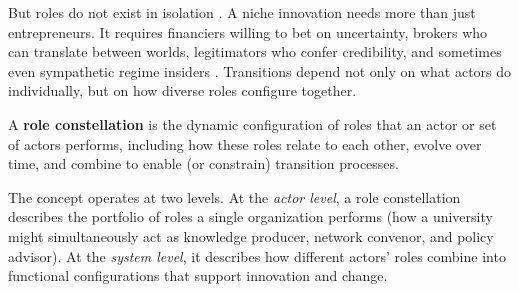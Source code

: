 \documentclass[../main.tex]{subfiles}
\begin{document}
But roles do not exist in isolation \cite{padgett2012emergence}. A niche innovation needs more than just entrepreneurs. It requires financiers willing to bet on uncertainty, brokers who can translate between worlds, legitimators who confer credibility, and sometimes even sympathetic regime insiders \cite{schot2018three,suchman1995managing}. Transitions depend not only on what actors do individually, but on how diverse roles configure together.

\begin{roledef}
A \textbf{role constellation} is the dynamic configuration of roles that an actor or set of actors performs, including how these roles relate to each other, evolve over time, and combine to enable (or constrain) transition processes.
\end{roledef}

The concept operates at two levels. At the \emph{actor level}, a role constellation describes the portfolio of roles a single organization performs (how a university might simultaneously act as knowledge producer, network convenor, and policy advisor). At the \emph{system level}, it describes how different actors' roles combine into functional configurations that support innovation and change.

\begin{center}

\label{fig:intro:constellation}
\end{center}
\end{document}
